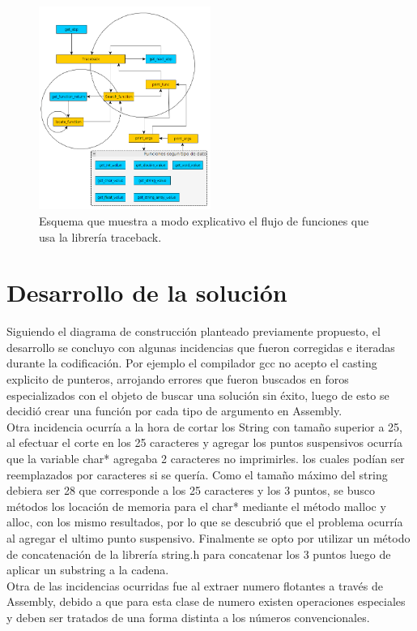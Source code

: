 \documentclass[twocolumn,11pts]{IEEEtran}
\begin{document}
\begin{figure}
  \centering
    \includegraphics[width=0.5\textwidth]{imagenes/esquema.png}
  \caption{Esquema que muestra a modo explicativo el flujo de funciones que usa la librería traceback.}
  \label{Fig 3}
\end{figure}


\section{Desarrollo de la solución}
Siguiendo el diagrama de construcción planteado previamente propuesto, el desarrollo se concluyo con algunas incidencias que fueron corregidas e iteradas durante la codificación. Por ejemplo el compilador gcc no acepto el casting explicito de punteros, arrojando errores que fueron buscados en foros especializados con el objeto de buscar una solución sin éxito, luego de esto se decidió crear una función por cada tipo de argumento en Assembly. \\
Otra incidencia ocurría a la hora de cortar los String con tamaño superior a 25, al efectuar el corte en los 25 caracteres y agregar los puntos suspensivos ocurría que la variable char* agregaba 2 caracteres no imprimirles. los cuales podían ser reemplazados por caracteres si se quería. Como el tamaño máximo del string debiera ser 28 que corresponde a los 25 caracteres y los 3 puntos, se busco métodos los locación de memoria para el char* mediante el método malloc y alloc, con los mismo resultados, por lo que se descubrió que el problema ocurría al agregar el ultimo punto suspensivo.
Finalmente se opto por utilizar un método de concatenación de la librería string.h para concatenar los 3 puntos luego de aplicar un substring a la cadena.\\
Otra de las incidencias ocurridas fue al extraer numero flotantes a través de Assembly, debido a que para esta clase de numero existen operaciones especiales y deben ser tratados de una forma distinta a los números convencionales.
\end{document}
